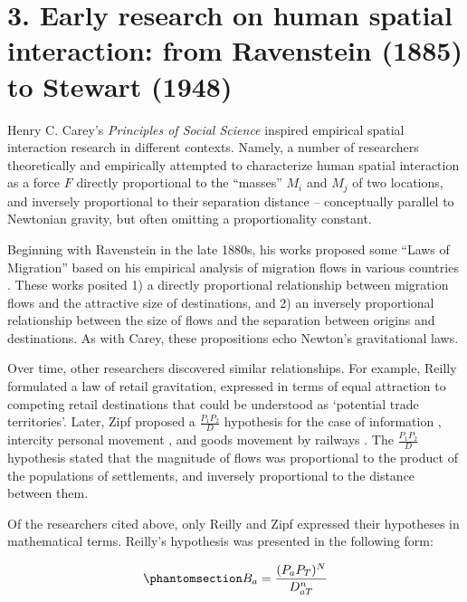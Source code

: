 \documentclass[
  10pt,
  letterpaper,
]{article}
\begin{document}
\section{3. Early research on human spatial interaction: from Ravenstein
(1885) to Stewart
(1948)}\label{early-research-on-human-spatial-interaction-from-ravenstein-1885-to-stewart-1948}

Henry C. Carey's \emph{Principles of Social Science}
\citep{careyPrinciplesSocialScience1858} inspired empirical spatial
interaction research in different contexts. Namely, a number of
researchers theoretically and empirically attempted to characterize
human spatial interaction as a force \(F\) directly proportional to the
``masses'' \(M_i\) and \(M_j\) of two locations, and inversely
proportional to their separation distance -- conceptually parallel to
Newtonian gravity, but often omitting a proportionality constant.

Beginning with Ravenstein in the late 1880s, his works proposed some
``Laws of Migration'' based on his empirical analysis of migration flows
in various countries
\citep{ravensteinLawsMigration1885, ravensteinLawsMigration1889}. These
works posited 1) a directly proportional relationship between migration
flows and the attractive size of destinations, and 2) an inversely
proportional relationship between the size of flows and the separation
between origins and destinations. As with Carey, these propositions echo
Newton's gravitational laws.

Over time, other researchers discovered similar relationships. For
example, Reilly \citep{reilly1929methods} formulated a law of retail
gravitation, expressed in terms of equal attraction to competing retail
destinations that could be understood as `potential trade territories'.
Later, Zipf proposed a \(\frac{P_1P_2}{D}\) hypothesis for the case of
information \citep{zipfDeterminantsCirculationInformation1946},
intercity personal movement \citep{zipfHypothesisIntercityMovement1946},
and goods movement by railways \citep{zipfHypothesisCaseRailway1946}.
The \(\frac{P_1P_2}{D}\) hypothesis stated that the magnitude of flows
was proportional to the product of the populations of settlements, and
inversely proportional to the distance between them.

Of the researchers cited above, only Reilly and Zipf expressed their
hypotheses in mathematical terms. Reilly's hypothesis was presented in
the following form:

\begin{equation}\phantomsection\label{eq-reilly}{
B_a = \frac{(P_a P_T)^N}{D_{aT}^n}
}\end{equation}
\end{document}
